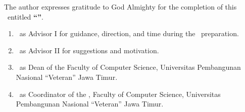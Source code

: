 The author expresses gratitude to God Almighty for the completion of this \DocTypeLabel\ entitled \textbf{``\ThesisTitle''}. \DegreeRequirement


\begin{enumerate}
  \item \AdvisorOne\ as Advisor I for guidance, direction, and time during the \DocTypeNameLower\ preparation.
  \item \AdvisorTwo\ as Advisor II for suggestions and motivation.
  \item \DeanName\ as Dean of the Faculty of Computer Science, Universitas Pembangunan Nasional ``Veteran'' Jawa Timur.
  \item \HeadOfProgramName\ as Coordinator of the \StudyProgramPhrase, Faculty of Computer Science, Universitas Pembangunan Nasional ``Veteran'' Jawa Timur.
\end{enumerate}
